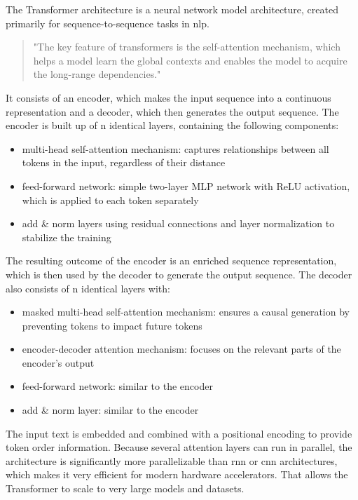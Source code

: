 \documentclass[conference]{IEEEtran}
\begin{document}
  The Transformer architecture is a neural network model architecture, created primarily for sequence-to-sequence tasks in \ac{nlp}. 
  \begin{quote}
    "The key feature of transformers is the self-attention mechanism, which helps a model learn the global contexts and enables the model to acquire the long-range dependencies." \cite{vit-state-challenges}
  \end{quote}
  It consists of an encoder, which makes the input sequence into a continuous representation and a decoder, which then generates the output sequence. The encoder is built up of n identical layers, containing the following components:
  \begin{itemize}
    \item multi-head self-attention mechanism: captures relationships between all tokens in the input, regardless of their distance
    \item feed-forward network: simple two-layer MLP network with ReLU activation, which is applied to each token separately
    \item add \& norm layers using residual connections and layer normalization to stabilize the training
  \end{itemize}
  The resulting outcome of the encoder is an enriched sequence representation, which is then used by the decoder to generate the output sequence. The decoder also consists of n identical layers with:
  \begin{itemize}
    \item masked multi-head self-attention mechanism: ensures a causal generation by preventing tokens to impact future tokens
    \item encoder-decoder attention mechanism: focuses on the relevant parts of the encoder's output
    \item feed-forward network: similar to the encoder
    \item add \& norm layer: similar to the encoder
  \end{itemize}
  The input text is embedded and combined with a positional encoding to provide token order information. Because several attention layers can run in parallel, the architecture is significantly more parallelizable than \ac{rnn} or \ac{cnn} architectures, which makes it very efficient for modern hardware accelerators. That allows the Transformer to scale to very large models and datasets. \cite{transformer2017}
\end{document}
